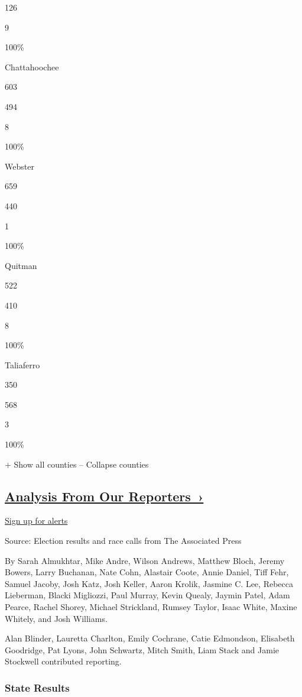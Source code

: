 126

9

100\%

Chattahoochee

603

494

8

100\%

Webster

659

440

1

100\%

Quitman

522

410

8

100\%

Taliaferro

350

568

3

100\%

+ Show all counties -- Collapse counties

\hypertarget{analysis-from-our-reporters-}{%
\subsection{\texorpdfstring{\href{https://www.nytimes.com/interactive/2018/11/06/us/elections/live-midterm-election-analysis-updates.html}{Analysis
From Our
Reporters~›}}{Analysis From Our Reporters~›}}\label{analysis-from-our-reporters-}}

\protect\hyperlink{}{Sign up for alerts}

Source: Election results and race calls from The Associated Press

By Sarah Almukhtar, Mike Andre, Wilson Andrews, Matthew Bloch, Jeremy
Bowers, Larry Buchanan, Nate Cohn, Alastair Coote, Annie Daniel, Tiff
Fehr, Samuel Jacoby, Josh Katz, Josh Keller, Aaron Krolik, Jasmine C.
Lee, Rebecca Lieberman, Blacki Migliozzi, Paul Murray, Kevin Quealy,
Jaymin Patel, Adam Pearce, Rachel Shorey, Michael Strickland, Rumsey
Taylor, Isaac White, Maxine Whitely, and Josh Williams.

Alan Blinder, Lauretta Charlton, Emily Cochrane, Catie Edmondson,
Elisabeth Goodridge, Pat Lyons, John Schwartz, Mitch Smith, Liam Stack
and Jamie Stockwell contributed reporting.

\hypertarget{state-results}{%
\subsubsection{State Results}\label{state-results}}

